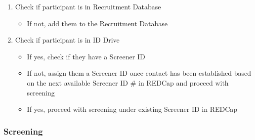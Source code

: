 \documentclass[
]{book}
\providecommand{\tightlist}{%
  \setlength{\itemsep}{0pt}\setlength{\parskip}{0pt}}
\begin{document}
\begin{enumerate}
\def\labelenumi{\arabic{enumi}.}
\tightlist
\item
  Check if participant is in Recruitment Database

  \begin{itemize}
  \tightlist
  \item
    If not, add them to the Recruitment Database
  \end{itemize}
\item
  Check if participant is in ID Drive

  \begin{itemize}
  \tightlist
  \item
    If yes, check if they have a Screener ID
  \item
    If not, assign them a Screener ID once contact has been established based on the next available Screener ID \# in REDCap and proceed with screening
  \item
    If yes, proceed with screening under existing Screener ID in REDCap
  \end{itemize}
\end{enumerate}

\hypertarget{screening}{%
\subsubsection{Screening}\label{screening}}
\end{document}
